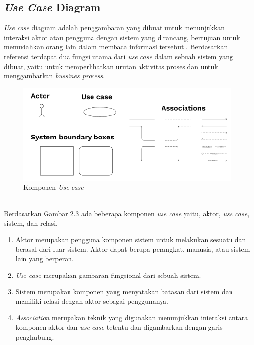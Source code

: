 \begin{flushleft}
\begin{justify}
        \subsection{\textit{Use Case} Diagram}
            \textit{Use case} diagram adalah penggambaran yang dibuat untuk menunjukkan interaksi aktor atau pengguna dengan sistem yang dirancang, bertujuan untuk memudahkan orang lain dalam membaca informasi tersebut \cite{use case 1,use case 2}.
            Berdasarkan referensi \cite{use case 1} terdapat dua fungsi utama dari \textit{use case} dalam sebuah sistem yang dibuat, yaitu untuk memperlihatkan urutan aktivitas proses dan untuk menggambarkan \textit{bussines process}. 
            \begin{figure}[ht]
                \centering
                \includegraphics[width=12cm]{images/bab 2/use componen.png}
                \caption{Komponen \textit{Use case}}
            \end{figure}
            \vspace{5cm}
            \\Berdasarkan Gambar 2.3 ada beberapa komponen \emph{use case} \cite{use case 1, figma uc} yaitu, aktor, \emph{use case}, sistem, dan relasi.
            \begin{enumerate}
                \item Aktor merupakan pengguna komponen sistem untuk melakukan sesuatu dan berasal dari luar sistem. Aktor dapat berupa perangkat, manusia, atau sistem lain yang berperan.
                \item \emph{Use case} merupakan gambaran fungsional dari sebuah sistem. 
                \item Sistem merupakan komponen yang menyatakan batasan dari sistem dan memiliki relasi dengan aktor sebagai penggunanya. 
                \item \emph{Association} merupakan teknik yang digunakan menunjukkan interaksi antara komponen aktor dan \emph{use case} tetentu dan digambarkan dengan garis penghubung.\\
            \end{enumerate}
            

\end{justify}
\end{flushleft}
